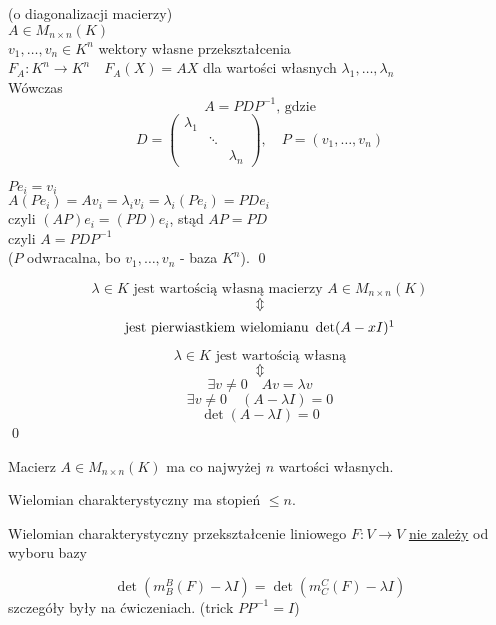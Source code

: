 \begin{tw} (o diagonalizacji macierzy) \\
    $ A \in M_{n \times n} (K)$ \\
    $v_1, \ldots, v_n \in K^n$ wektory własne przekształcenia \\
    $F_A: K^n \to K^n \quad F_A(X) = AX$ dla wartości własnych $\lambda_1,\ldots,\lambda_n$\\
    Wówczas
    $$ A = PDP^{-1} \text{, gdzie}$$
    $$ D = \begin{pmatrix} \lambda_1 & & \\ & \ddots & \\ & & \lambda_n \end{pmatrix},
     \quad 
     P = (v_1,\ldots,v_n)$$
\end{tw} 

\begin{dd} 
    $Pe_i = v_i$ \\ 
    $A(P e_i) = A v_i  = \lambda_i v_i = \lambda_i (P e_i) = PD e_i$ \\ 
    czyli $(AP)e_i = (PD)e_i$, stąd $AP=PD$ \\ 
    czyli $A = PDP^{-1}$ \\ 
    ($P$ odwracalna, bo $v_1,\ldots,v_n$ - baza $K^n$). \hfill \qed
\end{dd} 
\begin{ft} 
    $$\lambda \in K \text{ jest wartością własną macierzy } A \in M_{n \times n}(K)$$
    $$ \Updownarrow $$
    $$\text{jest pierwiastkiem wielomianu } \det(A-xI)\footnotemark$$
\end{ft}
\begin{dd} 
    $$\lambda \in K \text{ jest wartością własną}$$
    $$ \Updownarrow $$
    $$\exists v \neq 0 \quad Av = \lambda v$$
    $$ \exists v \neq 0 \quad (A-\lambda I) = 0 $$
    $$ \det(A-\lambda I) = 0$$
    \hfill \qed
\end{dd} 
\begin{wn} 
    Macierz $A \in M_{n \times n} (K)$ ma co najwyżej $n$ wartości własnych. 
\end{wn}
\begin{dd} 
    Wielomian charakterystyczny ma stopień $\le n$. 
\end{dd} 
\begin{ft} 
    Wielomian charakterystyczny przekształcenie liniowego $F: V \to V$ \underline{nie zależy} od wyboru bazy 
\end{ft} 
\begin{dd} 
    $$\det (m_B^B (F) - \lambda I) = \det (m_C^C (F) - \lambda I)$$ 
    szczegóły były na ćwiczeniach. (trick $PP^{-1} = I$)
\end{dd} 
